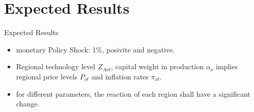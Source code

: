 \documentclass[
presentation.tex
]{subfiles}
\begin{document}
\section{Expected Results}
	
	
\begin{frame}[fragile]{Expected Results}
		
		\begin{itemize}
			
			\item monetary Policy Shock: 1\%, posivite and negative.
			
			\item Regional technology level $Z_{A\nu t}$, capital weight in production $\alpha_{\nu}$ implies regional price levels $P_{\nu t}$ and inflation rates $\pi_{\nu t}$.
			
			\item for different parameters, the reaction of each region shall have a significant change.
			
		\end{itemize}
		
	\end{frame}
\end{document}
